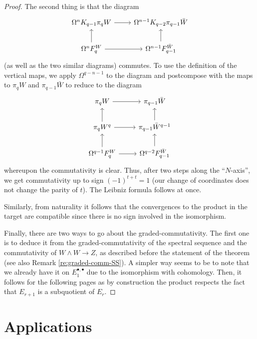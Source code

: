 \documentclass{amsart}
\theoremstyle{definition}
\begin{document}
\begin{proof}
    The second thing is that the diagram
    \[\begin{tikzcd}
    	{\Omega^n K_{q-1}\pi_qW } & {\Omega^{n-1} K_{q-2}\pi_{q-1}{\bar{W}}} \\
    	{\Omega^n F_q^W } & {\Omega^{n-1} F^{\bar{W}}_{q-1}}
    	\arrow[from=1-1, to=1-2]
    	\arrow[from=2-1, to=1-1]
    	\arrow[from=2-1, to=2-2]
    	\arrow[from=2-2, to=1-2]
    \end{tikzcd}\]
    (as well as the two similar diagrams) commutes. To use the definition of the vertical maps, we apply $\Omega^{q-n-1}$ to the diagram and postcompose with the maps to $\pi_q W$ and $\pi_{q-1}\bar{W}$ to reduce to the diagram
    \[\begin{tikzcd}
    	{\pi_q W} & {\pi_{q-1}{\bar{W}}} \\
    	{\pi_qW^q} & {\pi_{q-1}\bar{W}^{q-1}} \\
    	{\Omega^{q-1}{F_q^W}} & {\Omega^{q-2} F^{\bar{W}}_{q-1}}
    	\arrow[from=1-1, to=1-2]
    	\arrow[from=2-1, to=1-1]
    	\arrow[from=2-1, to=2-2]
    	\arrow[from=2-2, to=1-2]
    	\arrow[from=3-1, to=2-1]
    	\arrow[from=3-1, to=3-2]
    	\arrow[from=3-2, to=2-2]
    \end{tikzcd}\]
    whereupon the commutativity is clear.
    Thus, after two steps along the ``$N$-axis'', we get commutativity up to sign $(-1)^{t+t} = 1$ (our change of coordinates does not change the parity of $t$). The Leibniz formula follows at once.

    Similarly, from naturality it follows that the convergences to the product in the target are compatible since there is no sign involved in the isomorphism.

    Finally, there are two ways to go about the graded-commutativity. The first one is to deduce it from the graded-commutativity of the spectral sequence and the commutativity of $W \wedge W \to Z$, as described before the statement of the theorem (see also Remark \ref{re:graded-comm-SS}). A simpler way seems to be to note that we already have it on $E_1^{\bullet, \bullet}$ due to the isomorphism with cohomology. Then, it follows for the following pages as by construction the product respects the fact that $E_{r+1}$ is a subquotient of $E_r$.
    \end{proof}



\section{Applications}\label{se:appls}
\end{document}
